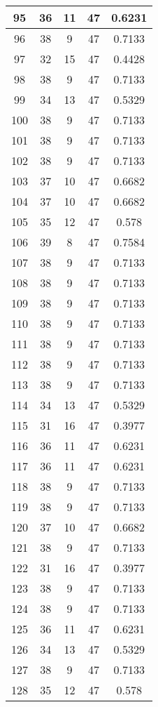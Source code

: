 \documentclass[letterpaper, 12pt]{article}
\begin{document}
\begin{longtable}{|c|c|c|c|c|}
\hline
95 & 36 & 11 & 47 & 0.6231 \\
\hline
96 & 38 & 9 & 47 & 0.7133 \\
\hline
97 & 32 & 15 & 47 & 0.4428 \\
\hline
98 & 38 & 9 & 47 & 0.7133 \\
\hline
99 & 34 & 13 & 47 & 0.5329 \\
\hline
100 & 38 & 9 & 47 & 0.7133 \\
\hline
101 & 38 & 9 & 47 & 0.7133 \\
\hline
102 & 38 & 9 & 47 & 0.7133 \\
\hline
103 & 37 & 10 & 47 & 0.6682 \\
\hline
104 & 37 & 10 & 47 & 0.6682 \\
\hline
105 & 35 & 12 & 47 & 0.578 \\
\hline
106 & 39 & 8 & 47 & 0.7584 \\
\hline
107 & 38 & 9 & 47 & 0.7133 \\
\hline
108 & 38 & 9 & 47 & 0.7133 \\
\hline
109 & 38 & 9 & 47 & 0.7133 \\
\hline
110 & 38 & 9 & 47 & 0.7133 \\
\hline
111 & 38 & 9 & 47 & 0.7133 \\
\hline
112 & 38 & 9 & 47 & 0.7133 \\
\hline
113 & 38 & 9 & 47 & 0.7133 \\
\hline
114 & 34 & 13 & 47 & 0.5329 \\
\hline
115 & 31 & 16 & 47 & 0.3977 \\
\hline
116 & 36 & 11 & 47 & 0.6231 \\
\hline
117 & 36 & 11 & 47 & 0.6231 \\
\hline
118 & 38 & 9 & 47 & 0.7133 \\
\hline
119 & 38 & 9 & 47 & 0.7133 \\
\hline
120 & 37 & 10 & 47 & 0.6682 \\
\hline
121 & 38 & 9 & 47 & 0.7133 \\
\hline
122 & 31 & 16 & 47 & 0.3977 \\
\hline
123 & 38 & 9 & 47 & 0.7133 \\
\hline
124 & 38 & 9 & 47 & 0.7133 \\
\hline
125 & 36 & 11 & 47 & 0.6231 \\
\hline
126 & 34 & 13 & 47 & 0.5329 \\
\hline
127 & 38 & 9 & 47 & 0.7133 \\
\hline
128 & 35 & 12 & 47 & 0.578 \\

\end{longtable}
\end{document}
